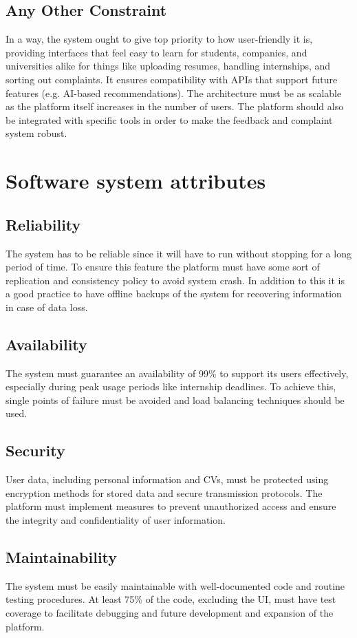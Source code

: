 \subsection{Any Other Constraint}
\label{subsec: hardware_limitations}%
In a way, the system ought to give top priority to how user-friendly it is, providing interfaces that feel easy to learn for students, companies, and universities alike for things like uploading resumes, handling internships, and sorting out complaints. It ensures compatibility with APIs that support future features (e.g. AI-based recommendations).  The architecture must be as scalable as the platform itself increases in the number of users. The platform should also be integrated with specific tools in order to make the feedback and complaint system robust.
\section{Software system attributes}
\label{sec:performance_requirements}%

\subsection{Reliability}
\label{subsec: reliability}%
The system has to be reliable since it will have to run without stopping for a long period of time. To ensure this feature the platform must have some sort of replication and consistency policy to avoid system crash. In addition to this it is a good practice to have offline backups of the system for recovering information in case of data loss. 
\subsection{Availability}
\label{subsec: availability}%
The system must guarantee an availability of 99\% to support its users effectively, especially during peak usage periods like internship deadlines. To achieve this, single points of failure must be avoided and load balancing techniques should be used. 
\subsection{Security}
\label{subsec: security }%
User data, including personal information and CVs, must be protected using encryption methods for stored data and secure transmission protocols. The platform must implement measures to prevent unauthorized access and ensure the integrity and confidentiality of user information. 
\subsection{Maintainability}
\label{subsec: maintainability}%
The system must be easily maintainable with well-documented code and routine testing procedures. At least 75\% of the code, excluding the UI, must have test coverage to facilitate debugging and future development and expansion of the platform. 
